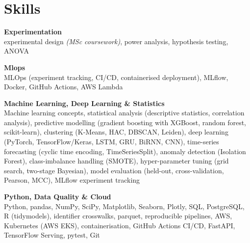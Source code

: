 \documentclass[a4paper,11pt]{article}
\newcommand{\skillgroup}[2]{{\color{headernavy}\textbf{#1}}\\ #2\par\vspace{3pt}}
\begin{document}
\section{Skills}
\skillgroup{Experimentation}{experimental design \textit{(MSc coursework)}, power analysis, hypothesis testing, ANOVA}
\skillgroup{Mlops}{MLOps (experiment tracking, CI/CD, containerised deployment), MLflow, Docker, GitHub Actions, AWS Lambda}
\skillgroup{Machine Learning, Deep Learning \& Statistics}{Machine learning concepts, statistical analysis (descriptive statistics, correlation analysis), predictive modelling (gradient boosting with XGBoost, random forest, scikit-learn), clustering (K-Means, HAC, DBSCAN, Leiden), deep learning (PyTorch, TensorFlow/Keras, LSTM, GRU, BiRNN, CNN), time-series forecasting (cyclic time encoding, TimeSeriesSplit), anomaly detection (Isolation Forest), class-imbalance handling (SMOTE), hyper-parameter tuning (grid search, two-stage Bayesian), model evaluation (held-out, cross-validation, Pearson, MCC), MLflow experiment tracking}
\skillgroup{Python, Data Quality \& Cloud}{Python, pandas, NumPy, SciPy, Matplotlib, Seaborn, Plotly, SQL, PostgreSQL, R (tidymodels), identifier crosswalks, parquet, reproducible pipelines, AWS, Kubernetes (AWS EKS), containerisation, GitHub Actions CI/CD, FastAPI, TensorFlow Serving, pytest, Git}
\end{document}
